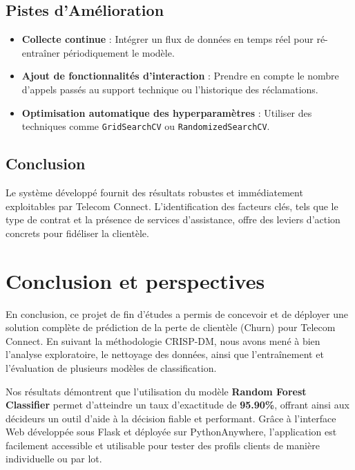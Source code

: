 \documentclass[a4paper,12pt]{report}
\begin{document}
\section{Pistes d'Amélioration}
\begin{itemize}
    \item \textbf{Collecte continue} : Intégrer un flux de données en temps réel pour ré-entraîner périodiquement le modèle.
    \item \textbf{Ajout de fonctionnalités d'interaction} : Prendre en compte le nombre d'appels passés au support technique ou l'historique des réclamations.
    \item \textbf{Optimisation automatique des hyperparamètres} : Utiliser des techniques comme \texttt{GridSearchCV} ou \texttt{RandomizedSearchCV}.
\end{itemize}

\section{Conclusion}
Le système développé fournit des résultats robustes et immédiatement exploitables par Telecom Connect. L'identification des facteurs clés, tels que le type de contrat et la présence de services d'assistance, offre des leviers d'action concrets pour fidéliser la clientèle.

\chapter*{Conclusion et perspectives}
En conclusion, ce projet de fin d'études a permis de concevoir et de déployer une solution complète de prédiction de la perte de clientèle (Churn) pour Telecom Connect. En suivant la méthodologie CRISP-DM, nous avons mené à bien l'analyse exploratoire, le nettoyage des données, ainsi que l'entraînement et l'évaluation de plusieurs modèles de classification.

Nos résultats démontrent que l'utilisation du modèle \textbf{Random Forest Classifier} permet d'atteindre un taux d'exactitude de \textbf{95.90\%}, offrant ainsi aux décideurs un outil d'aide à la décision fiable et performant. Grâce à l'interface Web développée sous Flask et déployée sur PythonAnywhere, l'application est facilement accessible et utilisable pour tester des profils clients de manière individuelle ou par lot.
\end{document}
